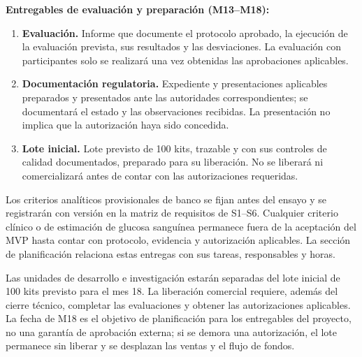 \noindent\textbf{Entregables de evaluación y preparación (M13--M18):}
\begin{enumerate}
\item \textbf{Evaluación.} Informe que documente el protocolo aprobado, la ejecución de la evaluación prevista, sus resultados y las desviaciones. La evaluación con participantes solo se realizará una vez obtenidas las aprobaciones aplicables.
\item \textbf{Documentación regulatoria.} Expediente y presentaciones aplicables preparados y presentados ante las autoridades correspondientes; se documentará el estado y las observaciones recibidas. La presentación no implica que la autorización haya sido concedida.
\item \textbf{Lote inicial.} Lote previsto de 100 kits, trazable y con sus controles de calidad documentados, preparado para su liberación. No se liberará ni comercializará antes de contar con las autorizaciones requeridas.
\end{enumerate}

Los criterios analíticos provisionales de banco se fijan antes del ensayo y se registrarán con versión en la matriz de requisitos de S1--S6. Cualquier criterio clínico o de estimación de glucosa sanguínea permanece fuera de la aceptación del MVP hasta contar con protocolo, evidencia y autorización aplicables. La sección de planificación relaciona estas entregas con sus tareas, responsables y horas.

Las unidades de desarrollo e investigación estarán separadas del lote inicial de 100 kits previsto para el mes 18. La liberación comercial requiere, además del cierre técnico, completar las evaluaciones y obtener las autorizaciones aplicables. La fecha de M18 es el objetivo de planificación para los entregables del proyecto, no una garantía de aprobación externa; si se demora una autorización, el lote permanece sin liberar y se desplazan las ventas y el flujo de fondos.
